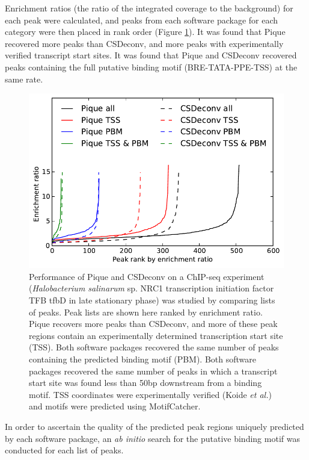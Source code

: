 \begin{refsection}
Enrichment ratios (the ratio of the integrated coverage to the
background) for each peak were calculated, and peaks from each
software package for each category were then placed in rank order
(Figure \ref{P_ranked_peaks}). It was found that Pique recovered more
peaks than CSDeconv, and more peaks with experimentally verified
transcript start sites. It was found that Pique and CSDeconv recovered
peaks containing the full putative binding motif (BRE-TATA-PPE-TSS) at
the same rate.

\begin{figure}
  \begin{center}
  \includegraphics{pique/figures/pique_csd_ranks.pdf}
  \end{center}
  \caption{Performance of Pique and CSDeconv on a ChIP-seq experiment
    ({\em Halobacterium salinarum} sp. NRC1 transcription initiation
    factor TFB tfbD in late stationary phase) was studied by comparing
    lists of peaks. Peak lists are shown here ranked by enrichment
    ratio. Pique recovers more peaks than CSDeconv, and more of these
    peak regions contain an experimentally determined transcription
    start site (TSS). Both software packages recovered the same number
    of peaks containing the predicted binding motif (PBM). Both
    software packages recovered the same number of peaks in which a
    transcript start site was found less than 50bp downstream from a
    binding motif. TSS coordinates were experimentally verified (Koide
    {\em et al.}) \cite{halo_promoters} and motifs were predicted
    using MotifCatcher. \cite{Seitzer_2012}}\label{P_ranked_peaks}
\end{figure}

In order to ascertain the quality of the predicted peak regions
uniquely predicted by each software package, an {\em ab initio} search
for the putative binding motif was conducted for each list of peaks. 


\end{refsection}
